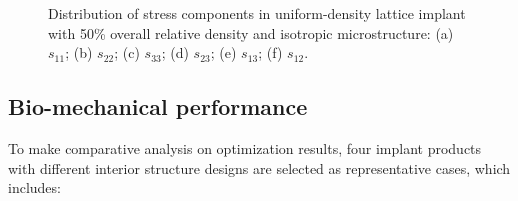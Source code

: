 \documentclass[12pt]{extbook}
\begin{document}
\begin{figure}[htbp]
\caption{Distribution of stress components in uniform-density lattice implant with 50\% overall relative density and isotropic microstructure: (a) $s_{11}$; (b) $s_{22}$; (c) $s_{33}$; (d) $s_{23}$; (e) $s_{13}$; (f) $s_{12}$.}
\label{component}
\end{figure}

\subsection{Bio-mechanical performance}

To make comparative analysis on optimization results, four implant products with different interior structure designs are selected as representative cases, which includes:\\
\end{document}

